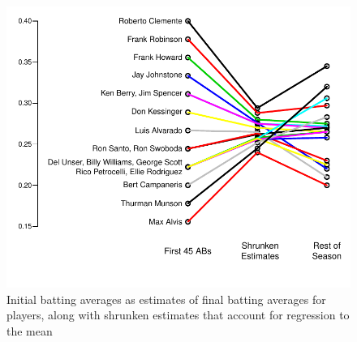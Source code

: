 \begin{Schunk}
\begin{figure}[htbp]
\centerline{\includegraphics{change-baseball-1} }

\caption[Baseball batting averages and regression to the mean]{Initial batting averages as estimates of final batting averages for players, along with shrunken estimates that account for regression to the mean}\label{fig:change-baseball}
\end{figure}
\end{Schunk}
